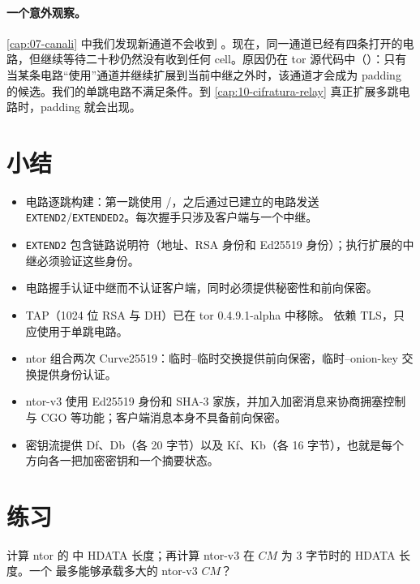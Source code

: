 \paragraph{一个意外观察。} \cref{cap:07-canali} 中我们发现新通道不会收到 。现在，同一通道已经有四条打开的电路，但继续等待二十秒仍然没有收到任何 cell。原因仍在 tor 源代码中（）：只有当某条电路\enquote{使用}通道并继续扩展到当前中继之外时，该通道才会成为 padding 的候选。我们的单跳电路不满足条件。到 \cref{cap:10-cifratura-relay} 真正扩展多跳电路时，padding 就会出现。

\section*{小结}
\begin{itemize}
  \item 电路逐跳构建：第一跳使用 /，之后通过已建立的电路发送 \texttt{EXTEND2}/\texttt{EXTENDED2}。每次握手只涉及客户端与一个中继。
  \item \texttt{EXTEND2} 包含链路说明符（地址、RSA 身份和 Ed25519 身份）；执行扩展的中继必须验证这些身份。
  \item 电路握手认证中继而不认证客户端，同时必须提供秘密性和前向保密。
  \item TAP（1024 位 RSA 与 DH）已在 tor 0.4.9.1-alpha 中移除。 依赖 TLS，只应使用于单跳电路。
  \item ntor 组合两次 Curve25519：临时--临时交换提供前向保密，临时--onion-key 交换提供身份认证。
  \item ntor-v3 使用 Ed25519 身份和 SHA-3 家族，并加入加密消息来协商拥塞控制与 CGO 等功能；客户端消息本身不具备前向保密。
  \item 密钥流提供 Df、Db（各 20 字节）以及 Kf、Kb（各 16 字节），也就是每个方向各一把加密密钥和一个摘要状态。
\end{itemize}

\section*{练习}

\begin{esercizio}[1]\label{es:09-dimensioni}
计算 ntor 的  中 HDATA 长度；再计算 ntor-v3 在 $CM$ 为 3 字节时的 HDATA 长度。一个  最多能够承载多大的 ntor-v3 $CM$？
\end{esercizio}

